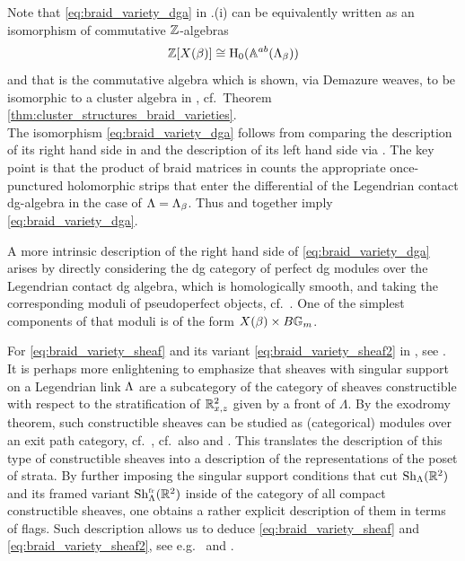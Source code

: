 \noindent Note that \eqref{eq:braid_variety_dga} in .(i) can be equivalently written as an isomorphism of commutative $\mathbb{Z}$-algebras
\begin{equation}\label{eq:braid_variety_dga2}
\mathbb{Z}[X(\beta)]\cong \mbox{H}_0(\mathbb{A}^{ab}(\Lambda_\beta))
\end{equation}
and that is the commutative algebra which is shown, via Demazure weaves, to be isomorphic to a cluster algebra in \cite[Theorem 1.1]{CGGLSS25}, cf.~Theorem \ref{thm:cluster_structures_braid_varieties}.\\

The isomorphism \eqref{eq:braid_variety_dga} follows from comparing the description of its right hand side in \cite[Prop.~5.2]{CasalsNg22} and the description of its left hand side via . The key point is that the product of braid matrices in  counts the appropriate once-punctured holomorphic strips that enter the differential of the Legendrian contact dg-algebra in the case of $\Lambda=\Lambda_\beta$. Thus \cite[Prop.~5.2]{CasalsNg22} and   together imply \eqref{eq:braid_variety_dga}.

\begin{remark}\label{rmk:Perf_dga} A more intrinsic description of the right hand side of \eqref{eq:braid_variety_dga} arises by directly considering the dg category of perfect dg modules over the Legendrian contact dg algebra, which is homologically smooth, and taking the corresponding moduli of pseudoperfect objects, cf.~\cite{ToenVaquie07}. One of the simplest components of that moduli is of the form $X(\beta)\times B\mathbb{G}_m$.\sbs
\end{remark}

For \eqref{eq:braid_variety_sheaf} and its variant \eqref{eq:braid_variety_sheaf2} in , see \cite[Section 2]{CasalsLi24}. It is perhaps more enlightening to emphasize that sheaves with singular support on a Legendrian link $\Lambda$ are a subcategory of the category of sheaves constructible with respect to the stratification of $\mathbb{R}^2_{x,z}$ given by a front of $\Lambda$. By the exodromy theorem, such constructible sheaves can be studied as (categorical) modules over an exit path category, cf.~\cite[Theorem A.9.3]{HA}, cf.~also \cite[Theorems 1.2 \& 6.10]{Treumann09_ExitPaths} and \cite[Chapters 0\&1]{barwick2020exodromy}. This translates the description of this type of constructible sheaves into a description of the representations of the poset of strata. By further imposing the singular support conditions that cut $\operatorname{Sh}_\Lambda(\mathbb{R}^2)$ and its framed variant $\operatorname{Sh}^{\mbox{\tiny fr}}_\Lambda(\mathbb{R}^2)$ inside of the category of all compact constructible sheaves, one obtains a rather explicit description of them in terms of flags. Such description allows us to deduce \eqref{eq:braid_variety_sheaf} and \eqref{eq:braid_variety_sheaf2}, see e.g.~\cite[Section 6]{STZ2017} and \cite[Section 4.1]{CasalsWeng22}.

